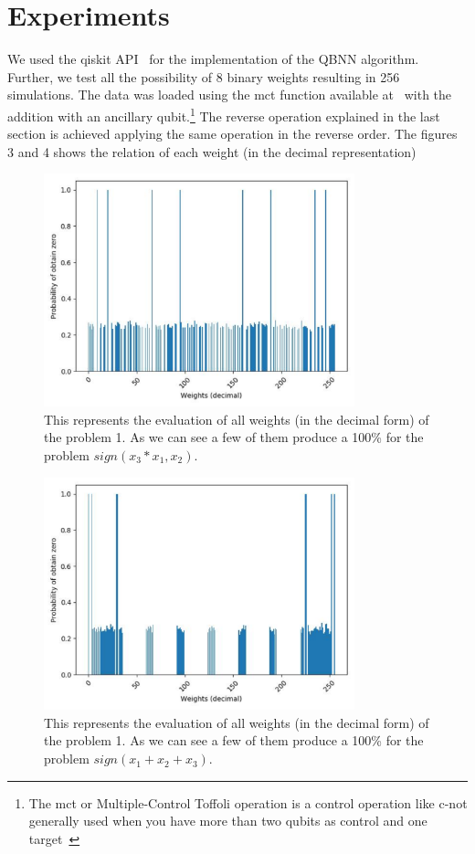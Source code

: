 \documentclass[conference]{IEEEtran}
\begin{document}
\section{Experiments}\label{sec:experiments}

    We used the qiskit API~\cite{Qiskit} for the implementation of the QBNN algorithm.
    Further, we test all the possibility of 8 binary weights resulting in 256 simulations.
    The data was loaded using the mct function available at~\cite{Qiskit} with the addition with an ancillary qubit.\footnote{
   The mct or Multiple-Control Toffoli operation is a control operation like c-not generally used when you have more than
   two qubits as control and one target~\cite{Maslov_2016}
}
    The reverse operation explained in the last section is achieved applying the same operation in the reverse order.
    The figures 3 and 4 shows the relation of each weight (in the decimal representation)

    \begin{figure}[h!]
    \centering
    \includegraphics[width=9cm, scale=0.4]{images/problem_1.pdf}
    \caption{This represents the evaluation of all weights (in the decimal form) of the problem 1.
    As we can see a few of them produce a 100\% for the problem \(sign(x_3*x_1, x_2)\).}\label{Fig:problem_1}
    \end{figure}

    \begin{figure}[h!]
        \centering
        \includegraphics[width=9cm, scale=0.4]{images/problem_2.pdf}
        \caption{This represents the evaluation of all weights (in the decimal form) of the problem 1.
        As we can see a few of them produce a 100\% for the problem \(sign(x_1 + x_2 + x_3)\).}\label{Fig:problem_2}
    \end{figure}
\end{document}
